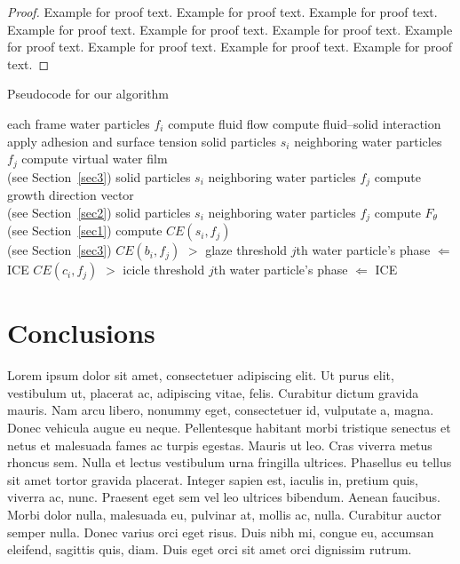 \documentclass[AMA,Times1COL]{WileyNJDv5} %
\begin{document}
\begin{proof}
Example for proof text. Example for proof text. Example for proof text. Example for proof text. Example for proof text. Example for proof text. Example for proof text. Example for proof text. Example for proof text. Example for proof text.
\end{proof}

\begin{algorithm}
\caption{\enskip Pseudocode for our algorithm}\label{alg1}
\begin{algorithmic}
  \For each frame
  \For water particles $f_{i}$
  \State compute fluid flow \cite{Hirt1974}
  \State compute fluid--solid interaction \cite{Benson1992}
  \State apply adhesion and surface tension \cite{Margolin2003}
  \EndFor
   \For solid particles $s_{i}$
   \For neighboring water particles $f_{j}$
   \State compute virtual water film \\(see Section~\ref{sec3})
   \EndFor
   \EndFor
   \For solid particles $s_{i}$
   \For neighboring water particles $f_{j}$
   \State compute growth direction vector \\(see Section~\ref{sec2})
   \EndFor
   \EndFor
   \For solid particles $s_{i}$
   \For neighboring water particles $f_{j}$
   \State compute $F_{\theta}$ (see Section~\ref{sec1})
   \State compute $CE(s_{i},f_{j})$ \\(see Section~\ref{sec3})
   \If $CE(b_{i}, f_{j})$ $>$ glaze threshold
   \State $j$th water particle's phase $\Leftarrow$ ICE
   \EndIf
   \If $CE(c_{i}, f_{j})$ $>$ icicle threshold
   \State $j$th water particle's phase $\Leftarrow$ ICE
   \EndIf
   \EndFor
   \EndFor
  \EndFor
\end{algorithmic}
\end{algorithm}



\section{Conclusions}\label{sec5}

Lorem ipsum dolor sit amet, consectetuer adipiscing elit. Ut purus elit, vestibulum ut, placerat ac, adipiscing vitae,
felis. Curabitur dictum gravida mauris. Nam arcu libero, nonummy eget, consectetuer id, vulputate a, magna. Donec
vehicula augue eu neque. Pellentesque habitant morbi tristique senectus et netus et malesuada fames ac turpis egestas.
Mauris ut leo. Cras viverra metus rhoncus sem. Nulla et lectus vestibulum urna fringilla ultrices. Phasellus eu tellus
sit amet tortor gravida placerat. Integer sapien est, iaculis in, pretium quis, viverra ac, nunc. Praesent eget sem vel
leo ultrices bibendum. Aenean faucibus. Morbi dolor nulla, malesuada eu, pulvinar at, mollis ac, nulla. Curabitur
auctor semper nulla. Donec varius orci eget risus. Duis nibh mi, congue eu, accumsan eleifend, sagittis quis, diam.
Duis eget orci sit amet orci dignissim rutrum.
\end{document}
